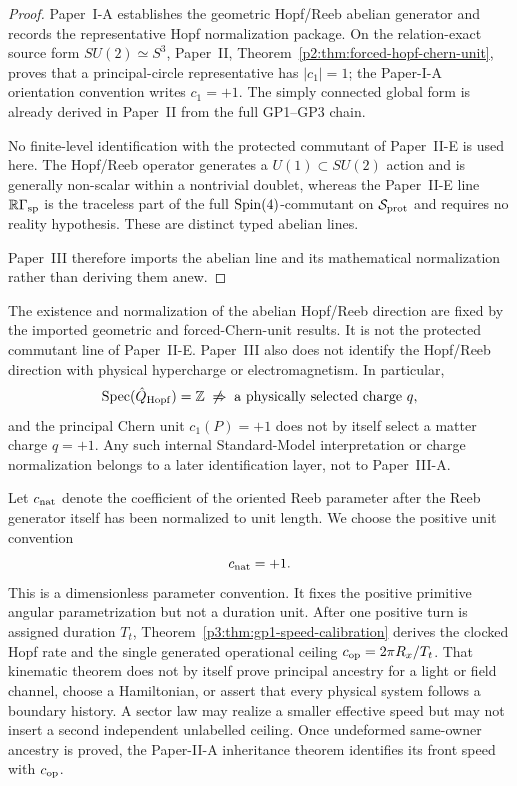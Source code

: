 \documentclass[12pt,a4paper]{article}
\begin{document}
\begin{proof}
Paper~I-A establishes the geometric Hopf/Reeb abelian generator and records the
representative Hopf normalization package.  On the relation-exact source form
\(SU(2)\simeq S^3\), Paper~II,
Theorem~\ref{p2:thm:forced-hopf-chern-unit}, proves that a principal-circle
representative has \(|c_1|=1\); the Paper-I-A orientation convention writes
\(c_1=+1\).  The simply connected global form is already derived in
Paper~II from the full GP1--GP3 chain.

No finite-level identification with the protected commutant of Paper~II-E is
used here.  The Hopf/Reeb operator generates a
\(U(1)\subset SU(2)\) action and is generally non-scalar within a nontrivial
doublet, whereas the Paper~II-E line
\(\mathbb R\Gamma_{\rm sp}\) is the traceless part of the full
\(\mathrm{Spin}(4)\)-commutant on \(\mathcal S_{\rm prot}\) and requires no reality hypothesis.
These are distinct typed abelian lines.

Paper~III therefore imports the abelian line and its mathematical normalization rather
than deriving them anew.
\end{proof}

\begin{remark}
The existence and normalization of the abelian Hopf/Reeb direction are fixed
by the imported geometric and forced-Chern-unit results.  It is not the
protected commutant line of Paper~II-E.  Paper~III also does not identify the Hopf/Reeb direction with physical
hypercharge or electromagnetism.  In particular,
\[
 \operatorname{Spec}(\hat Q_{\rm Hopf})=\mathbb Z
 \;\not\Rightarrow\;
 \text{a physically selected charge }q,
\]
and the principal Chern unit \(c_1(P)=+1\) does not by itself select a matter
charge \(q=+1\).  Any such internal Standard-Model interpretation or charge
normalization belongs to a later identification layer, not to Paper~III-A.
\end{remark}

\begin{definition}
\label{p3:lem:primitive-contact-speed-normalization}
Let \(c_{\rm nat}\) denote the coefficient of the oriented Reeb parameter after
the Reeb generator itself has been normalized to unit length.  We choose the
positive unit convention
\[
c_{\rm nat}=+1.
\]
This is a dimensionless parameter convention.  It fixes the positive
primitive angular parametrization but not a duration unit.  After one positive
turn is assigned duration \(T_t\),
Theorem~\ref{p3:thm:gp1-speed-calibration} derives the clocked Hopf rate and
the single generated operational ceiling
\(c_{\rm op}=2\pi R_x/T_t\).  That kinematic theorem does not by itself prove
principal ancestry for a light or field channel, choose a Hamiltonian, or
assert that every physical system follows a boundary history.  A sector law
may realize a smaller effective speed but may not insert a second independent
unlabelled ceiling.  Once undeformed same-owner ancestry is proved, the
Paper-II-A inheritance theorem identifies its front speed with
\(c_{\rm op}\).
\end{definition}
\end{document}
